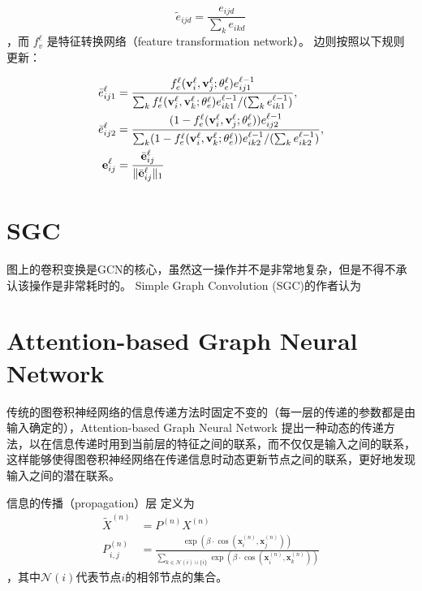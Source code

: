 \documentclass[color=gray,base=hide,cn]{elegantbook}
\begin{document}
\begin{equation}
    {\tilde e}_{ijd} = \frac{e_{ijd}}{\sum_{k}e_{ikd}}
\end{equation}
，而 $f_v^{\ell}$ 是特征转换网络（feature transformation network）。
边则按照以下规则更新：

\begin{align}
    {\bar e}_{ij1}^{\ell} & = \frac{f_{e}^{\ell}({\bf v}_{i}^{\ell}, {\bf v}_{j}^{\ell}; \theta_e^{\ell})e_{ij1}^{\ell-1}}{\sum_{k}f_{e}^{\ell}({\bf v}_{i}^{\ell}, {\bf v}_{k}^{\ell}; \theta_e^{\ell})e_{ik1}^{\ell-1}/(\sum_{k}e_{ik1}^{\ell-1})},        \\
    {\bar e}_{ij2}^{\ell} & =\frac{(1-f_{e}^{\ell}({\bf v}_{i}^{\ell}, {\bf v}_{j}^{\ell}; \theta_e^{\ell}))e_{ij2}^{\ell-1}}{\sum_{k}(1-f_{e}^{\ell}({\bf v}_{i}^{\ell}, {\bf v}_{k}^{\ell}; \theta_e^{\ell}))e_{ik2}^{\ell-1}/(\sum_{k}e_{ik2}^{\ell-1})},
    \\
    {\bf e}_{ij}^{\ell}   & = \frac{{\bar {\bf e}}_{ij}^{\ell}} {\|{\bar {\bf e}}_{ij}^{\ell}\|_1}
\end{align}


\section{SGC}
图上的卷积变换是GCN的核心，虽然这一操作并不是非常地复杂，但是不得不承认该操作是非常耗时的。 Simple Graph Convolution (SGC)\cite{wu2019simplifying}的作者认为


\section{Attention-based Graph Neural Network}
传统的图卷积神经网络的信息传递方法时固定不变的（每一层的传递的参数都是由输入确定的），Attention-based Graph Neural Network \cite{thekumparampil2018attentionbased}提出一种动态的传递方法，以在信息传递时用到当前层的特征之间的联系，而不仅仅是输入之间的联系，这样能够使得图卷积神经网络在传递信息时动态更新节点之间的联系，更好地发现输入之间的潜在联系。

信息的传播（propagation）层 定义为
\begin{align}
    \tilde{X}^{(n)} &= P^{(n)}X^{(n)} \\
    P^{(n)}_{i,j} &= \frac{\exp( \beta \cdot \cos(\mathbf{x}^{(n)}_i, \mathbf{x}^{(n)}_j))}
    {\sum_{k \in \mathcal{N}(i)\cup \{ i \}}  \exp( \beta \cdot
    \cos(\mathbf{x}^{(n)}_i, \mathbf{x}^{(n)}_k))}
\end{align}
，其中$\mathcal{N}(i)$代表节点$i$的相邻节点的集合。
\end{document}
